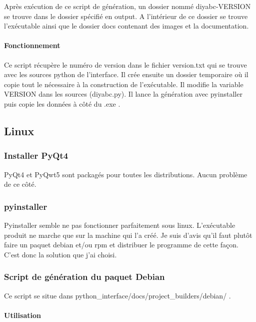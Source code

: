 \documentclass[12pt,a4paper]{article}
\begin{document}
        Après exécution de ce script de génération, un dossier nommé
        diyabc-VERSION se trouve dans le dossier spécifié en output. A
        l'intérieur de ce dossier se trouve l'exécutable ainsi que le dossier
        docs contenant des images et la documentation.

        \paragraph{Fonctionnement}

        Ce script récupère le numéro de version dans le fichier version.txt qui
        se trouve avec les sources python de l'interface. Il crée ensuite un
        dossier temporaire où il copie tout le nécessaire à la construction de
        l'exécutable. Il modifie la variable VERSION dans les sources
        (diyabc.py).  Il lance la génération avec pyinstaller puis copie les
        données à côté du .exe .

    \subsection{Linux}
        \subsubsection{Installer PyQt4}

        PyQt4 et PyQwt5 sont packagés pour toutes les distributions. Aucun
        problème de ce côté.
        \subsubsection{pyinstaller}

        Pyinstaller semble ne pas fonctionner parfaitement sous linux.
        L'exécutable produit ne marche que sur la machine qui l'a créé. Je suis
        d'avis qu'il faut plutôt faire un paquet debian et/ou rpm et distribuer
        le programme de cette façon. C'est donc la solution que j'ai choisi.
        \subsubsection{Script de génération du paquet Debian}

        Ce script se situe dans python\_interface/docs/project\_builders/debian/ .
        \paragraph{Utilisation}
\end{document}
